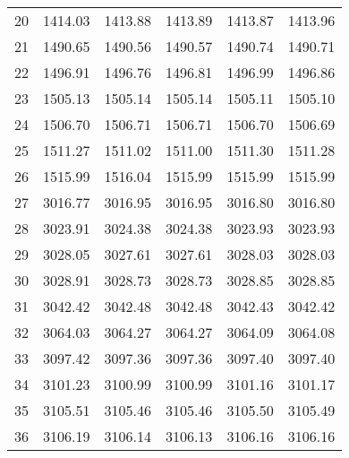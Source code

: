 \documentclass[10pt,oneside]{article}
\begin{document}
\begin{table}[h!]
\begin{tabular}{cccccc}
20 &   1414.03 & 1413.88 &    1413.89 & 1413.87 &   1413.96 \\
21 &   1490.65 & 1490.56 &    1490.57 & 1490.74 &   1490.71 \\
22 &   1496.91 & 1496.76 &    1496.81 & 1496.99 &   1496.86 \\
23 &   1505.13 & 1505.14 &    1505.14 & 1505.11 &   1505.10 \\
24 &   1506.70 & 1506.71 &    1506.71 & 1506.70 &   1506.69 \\
25 &   1511.27 & 1511.02 &    1511.00 & 1511.30 &   1511.28 \\
26 &   1515.99 & 1516.04 &    1515.99 & 1515.99 &   1515.99 \\
27 &   3016.77 & 3016.95 &    3016.95 & 3016.80 &   3016.80 \\
28 &   3023.91 & 3024.38 &    3024.38 & 3023.93 &   3023.93 \\
29 &   3028.05 & 3027.61 &    3027.61 & 3028.03 &   3028.03 \\
30 &   3028.91 & 3028.73 &    3028.73 & 3028.85 &   3028.85 \\
31 &   3042.42 & 3042.48 &    3042.48 & 3042.43 &   3042.42 \\
32 &   3064.03 & 3064.27 &    3064.27 & 3064.09 &   3064.08 \\
33 &   3097.42 & 3097.36 &    3097.36 & 3097.40 &   3097.40 \\
34 &   3101.23 & 3100.99 &    3100.99 & 3101.16 &   3101.17 \\
35 &   3105.51 & 3105.46 &    3105.46 & 3105.50 &   3105.49 \\
36 &   3106.19 & 3106.14 &    3106.13 & 3106.16 &   3106.16 \\
\bottomrule
\end{tabular}
\end{table}
\end{document}
